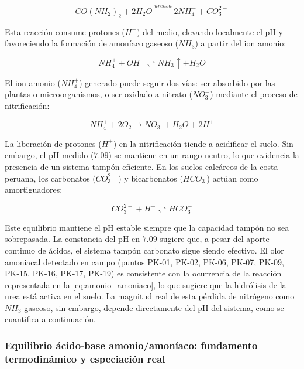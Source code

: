 \documentclass[fleqn]{jaes}
\begin{document}
\begin{equation}
CO(NH_2)_2 + 2H_2O \xrightarrow{ureasa} 2NH_4^+ + CO_3^{2-}
\label{eq:hidrolisis_urea}
\end{equation}

Esta reacción consume protones ($H^+$) del medio, elevando localmente el pH y favoreciendo la formación de amoníaco gaseoso ($NH_3$) a partir del ion amonio:

\begin{equation}
NH_4^+ + OH^- \rightleftharpoons NH_3 \uparrow + H_2O
\label{eq:amonio_amoniaco}
\end{equation}

El ion amonio ($NH_4^+$) generado puede seguir dos vías: ser absorbido por las plantas o microorganismos, o ser oxidado a nitrato ($NO_3^-$) mediante el proceso de nitrificación:

\begin{equation}
NH_4^+ + 2O_2 \rightarrow NO_3^- + H_2O + 2H^+
\label{eq:nitrificacion}
\end{equation}

La liberación de protones ($H^+$) en la nitrificación tiende a acidificar el suelo. Sin embargo, el pH medido ($7.09$) se mantiene en un rango neutro, lo que evidencia la presencia de un sistema tampón eficiente. En los suelos calcáreos de la costa peruana, los carbonatos ($CO_3^{2-}$) y bicarbonatos ($HCO_3^-$) actúan como amortiguadores:

\begin{equation}
CO_3^{2-} + H^+ \rightleftharpoons HCO_3^-
\label{eq:tampon_carbonato}
\end{equation}

Este equilibrio mantiene el pH estable siempre que la capacidad tampón no sea sobrepasada. La constancia del pH en $7.09$ sugiere que, a pesar del aporte continuo de ácidos, el sistema tampón carbonato sigue siendo efectivo. El olor amoniacal detectado en campo (puntos PK-01, PK-02, PK-06, PK-07, PK-09, PK-15, PK-16, PK-17, PK-19) es consistente con la ocurrencia de la reacción representada en la \cref{eq:amonio_amoniaco}, lo que sugiere que la hidrólisis de la urea está activa en el suelo. La magnitud real de esta pérdida de nitrógeno como $NH_3$ gaseoso, sin embargo, depende directamente del pH del sistema, como se cuantifica a continuación.

\subsubsection{Equilibrio ácido-base amonio/amoníaco: fundamento termodinámico y especiación real}
\end{document}
